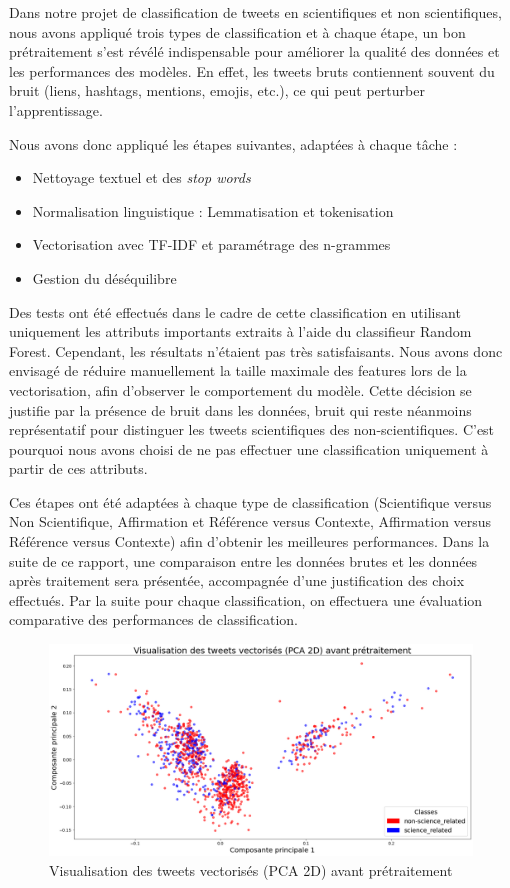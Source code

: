 Dans notre projet de classification de tweets en scientifiques et non scientifiques, nous avons appliqué trois types de classification et à chaque étape, un bon prétraitement s’est révélé indispensable pour améliorer la qualité des données et les performances des modèles.
En effet, les tweets bruts contiennent souvent du bruit (liens, hashtags, mentions, emojis, etc.), ce qui peut perturber l’apprentissage.

Nous avons donc appliqué les étapes suivantes, adaptées à chaque tâche :
\begin{itemize}
    \item Nettoyage textuel et des \textit{stop words}
    \item Normalisation linguistique : Lemmatisation et tokenisation
    \item Vectorisation avec TF-IDF et paramétrage des n-grammes
    \item Gestion du déséquilibre
\end{itemize}

Des tests ont été effectués dans le cadre de cette classification en utilisant uniquement les attributs importants extraits à l’aide du classifieur Random Forest.
Cependant, les résultats n’étaient pas très satisfaisants.
Nous avons donc envisagé de réduire manuellement la taille maximale des features lors de la vectorisation, afin d’observer le comportement du modèle.
Cette décision se justifie par la présence de bruit dans les données, bruit qui reste néanmoins représentatif pour distinguer les tweets scientifiques des non-scientifiques.
C’est pourquoi nous avons choisi de ne pas effectuer une classification uniquement à partir de ces attributs.

Ces étapes ont été adaptées à chaque type de classification (Scientifique versus Non Scientifique, Affirmation et Référence versus Contexte, Affirmation versus Référence versus Contexte) afin d’obtenir les meilleures performances.
Dans la suite de ce rapport, une comparaison entre les données brutes et les données après traitement sera présentée, accompagnée d’une justification des choix effectués.
Par la suite pour chaque classification, on effectuera une évaluation comparative des performances de classification.

\begin{figure}[H]
    \centering
    \includegraphics[width=\textwidth]{images/PCA-BPT}
    \caption{Visualisation des tweets vectorisés (PCA 2D) avant prétraitement}
    \label{fig:pca-bpt}
\end{figure}

